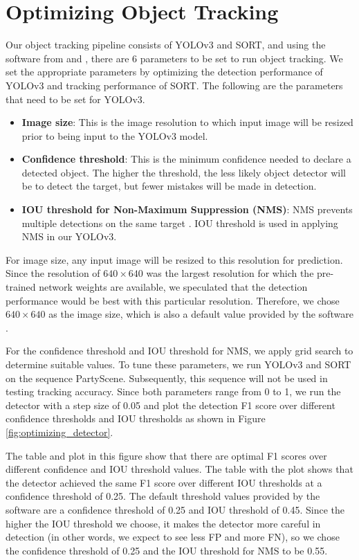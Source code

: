 \section{Optimizing Object Tracking}
\label{sec:methods/section_b}

Our object tracking pipeline consists of YOLOv3 and SORT, and using the software from \cite{jocher_ultralyticsyolov3_2021} and \cite{abewley_abewleysort_2021}, there are 6 parameters to be set to run object tracking. We set the appropriate parameters by optimizing the detection performance of YOLOv3 and tracking performance of SORT. The following are the parameters that need to be set for YOLOv3.
\begin{itemize}
    \item \textbf{Image size}: This is the image resolution to which input image will be resized prior to being input to the YOLOv3 model.
    \item \textbf{Confidence threshold}: This is the minimum confidence needed to declare a detected object. The higher the threshold, the less likely object detector will be to detect the target, but fewer mistakes will be made in detection.
    \item \textbf{IOU threshold for Non-Maximum Suppression (NMS)}: NMS prevents multiple detections on the same target \cite{redmon_you_2016}. IOU threshold is used in applying NMS in our YOLOv3.
\end{itemize}
For image size, any input image will be resized to this resolution for prediction. Since the resolution of $640\times640$ was the largest resolution for which the pre-trained network weights are available, we speculated that the detection performance would be best with this particular resolution. Therefore, we chose $640\times 640$ as the image size, which is also a default value provided by the software \cite{jocher_ultralyticsyolov3_2021}.

For the confidence threshold and IOU threshold for NMS, we apply grid search to determine suitable values. To tune these parameters, we run YOLOv3 and SORT on the sequence PartyScene. Subsequently, this sequence will not be used in testing tracking accuracy. Since both parameters range from 0 to 1, we run the detector with a step size of 0.05 and plot the detection F1 score over different confidence thresholds and IOU thresholds as shown in Figure \ref{fig:optimizing_detector}.

The table and plot in this figure show that there are optimal F1 scores over different confidence and IOU threshold values. The table with the plot shows that the detector achieved the same F1 score over different IOU thresholds at a confidence threshold of 0.25. The default threshold values provided by the software \cite{jocher_ultralyticsyolov3_2021} are a confidence threshold of 0.25 and IOU threshold of 0.45. Since the higher the IOU threshold we choose, it makes the detector more careful in detection (in other words, we expect to see less FP and more FN), so we chose the confidence threshold of 0.25 and the IOU threshold for NMS to be 0.55.


